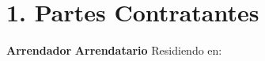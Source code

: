\section*{1. Partes Contratantes}
\textbf{Arrendador}
\ContractLandlordsES
\vspace{0.5cm}
\textbf{Arrendatario}
\ContractTenantsES
Residiendo en: \Propaddress
